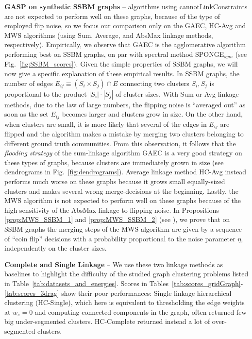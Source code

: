 \textbf{GASP on synthetic SSBM graphs}  -- 
\algname{} algorithms using cannotLinkConstraints are not expected to perform well on these graphs, because of the type of employed flip noise, so we focus our comparison only on the GAEC, HC-Avg and MWS algorithms (using Sum, Average, and AbsMax linkage methods, respectively).
Empirically, we observe that GAEC is the agglomerative algorithm performing best on SSBM graphs, on par with spectral method SPONGE$_{sym}$ (see Fig.~\ref{fig:SSBM_scores}). Given the simple properties of SSBM graphs, we will now give a specific explanation of these empirical results. 
In SSBM graphs, the number of edges $E_{ij}\equiv(S_i\times S_j)\cap E$ connecting two clusters $S_i,S_j$ is  proportional to the product $|S_i|\cdot|S_j|$ of cluster sizes. 
With Sum or Avg linkage methods, due to the law of large numbers, the flipping noise is ``averaged out'' as soon as the set $E_{ij}$ becomes larger and clusters grow in size.
On the other hand, when clusters are small, it is more likely that several of the edges in $E_{ij}$ are flipped and the algorithm makes a mistake by merging two clusters belonging to different ground truth communities. From this observation, it follows that the \emph{flooding strategy} of the sum-linkage algorithm GAEC is a very good strategy on these types of graphs, because clusters are immediately grown in size (see dendrograms in Fig.~\ref{fig:dendrograms}). Average linkage method HC-Avg instead performs much worse on these graphs because it grows small equally-sized clusters and makes several wrong merge-decisions at the beginning. 
Lastly, the MWS algorithm is not expected to perform well on these graphs because of the high sensitivity of the AbsMax linkage to flipping noise. In Propositions \ref{prop:MWS_SSBM_1} and \ref{prop:MWS_SSBM_2} (see ), we prove that on SSBM graphs the merging steps of the MWS algorithm are given by a sequence of ``coin flip'' decisions with a probability proportional to the noise parameter $\eta$, independently on the cluster sizes.

\textbf{Complete and Single Linkage} -- We use these two linkage methods as baselines to highlight the difficulty of the studied graph clustering problems listed in Table~\ref{tab:datasets_and_energies}. Scores in Tables~\ref{tab:scores_gridGraph}-\ref{tab:scores_3drag} show their poor performances: Single linkage hierarchical clustering (HC-Single), which here is equivalent to thresholding the edge weights at $w_e=0$ and computing connected components in the graph, often returned few big under-segmented clusters. HC-Complete returned instead a lot of over-segmented clusters. 




